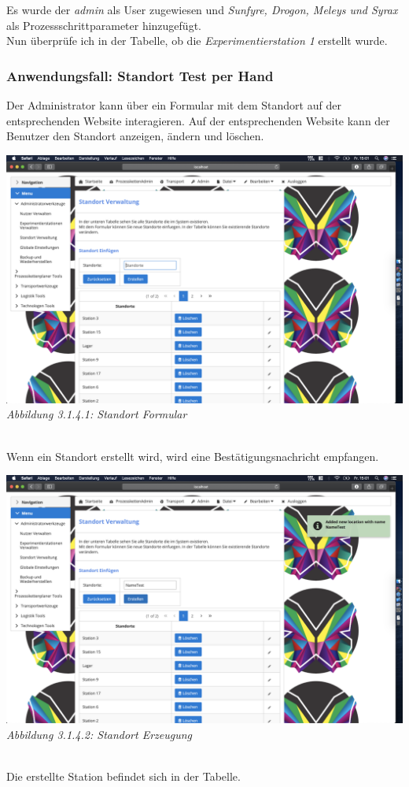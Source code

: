 \documentclass[enabledeprecatedfontcommands,fontsize=12pt,paper=a4,twoside]{scrartcl}
\begin{document}
Es wurde der \textit{admin} als User zugewiesen und \textit{Sunfyre, Drogon, Meleys und Syrax} als Prozessschrittparameter hinzugefügt. \\

Nun überprüfe ich in der Tabelle, ob die \textit{Experimentierstation 1} erstellt wurde. 




\subsubsection{Anwendungsfall: Standort Test per Hand}

Der Administrator kann über ein Formular mit dem Standort auf der entsprechenden Website interagieren. Auf der entsprechenden Website kann der Benutzer den Standort anzeigen, ändern und löschen.

\hypertarget{sc3.1.4.1}{
\includegraphics[width=1\textwidth]{Screenshots/4StandOrtFormular.png}
\textit{Abbildung 3.1.4.1: Standort Formular}
} \\

Wenn ein Standort erstellt wird, wird eine Bestätigungsnachricht empfangen.

\hypertarget{sc3.1.4.2}{
\includegraphics[width=1\textwidth]{Screenshots/4BeschaenigungAddLocation.png}
\textit{Abbildung 3.1.4.2: Standort Erzeugung}
} \\
Die erstellte Station befindet sich in der Tabelle.
\end{document}
